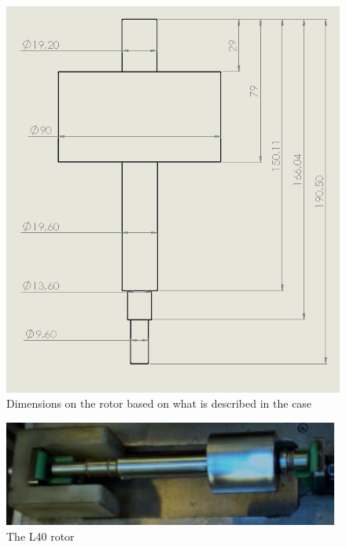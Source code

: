 \begin{figure}[H]
    \centering
    \includegraphics[width=.70\textwidth]{InitialProblemstatement/Case/rotordims.PNG}
    \caption{Dimensions on the rotor based on what is described in the case\cite{Case}}
    \label{fig:rotor_dims}
\end{figure}

\begin{figure}[H]
    \centering
    \includegraphics[width=.48\textwidth]{InitialProblemstatement/Case/rotorlille.PNG}
    \caption{The L40 rotor}
    \label{fig:rotor}
\end{figure}

